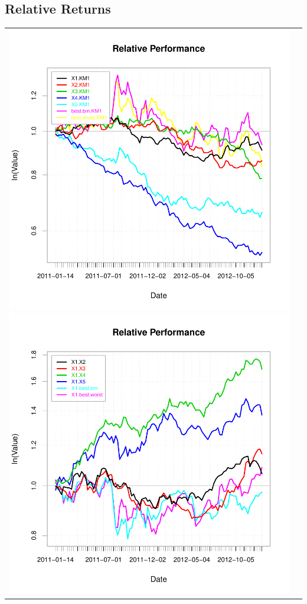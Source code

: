 \documentclass{article}
\begin{document}
\subsection{Relative Returns}
\begin{tabular}{cc}
\includegraphics{graphics/plot-012}
\includegraphics{graphics/plot-013}
\end{tabular}
\end{document}

